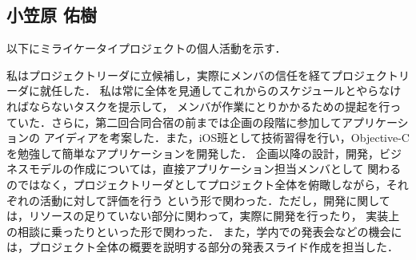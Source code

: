 \subsection{小笠原 佑樹}

以下にミライケータイプロジェクトの個人活動を示す．

私はプロジェクトリーダに立候補し，実際にメンバの信任を経てプロジェクトリーダに就任した．
私は常に全体を見通してこれからのスケジュールとやらなければならないタスクを提示して，
メンバが作業にとりかかるための提起を行っていた．さらに，第二回合同合宿の前までは企画の段階に参加してアプリケーションの
アイディアを考案した．また，iOS班として技術習得を行い，Objective-Cを勉強して簡単なアプリケーションを開発した．
企画以降の設計，開発，ビジネスモデルの作成については，直接アプリケーション担当メンバとして
関わるのではなく，プロジェクトリーダとしてプロジェクト全体を俯瞰しながら，それぞれの活動に対して評価を行う
という形で関わった．ただし，開発に関しては，リソースの足りていない部分に関わって，実際に開発を行ったり，
実装上の相談に乗ったりといった形で関わった．
また，学内での発表会などの機会には，プロジェクト全体の概要を説明する部分の発表スライド作成を担当した．


